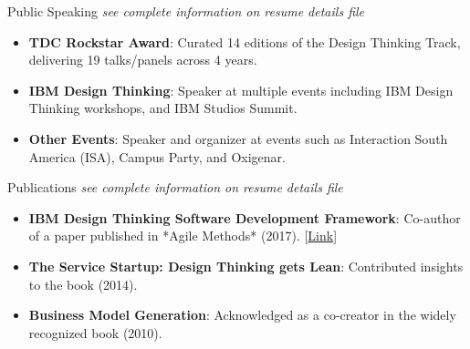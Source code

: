 \documentclass{resume} %
\begin{document}

\begin{rSection}{Public Speaking } 
\textit{see complete information on resume details file}
\begin{itemize}
    \item \textbf{TDC Rockstar Award}: Curated 14 editions of the Design Thinking Track, delivering 19 talks/panels across 4 years.
    \item \textbf{IBM Design Thinking}: Speaker at multiple events including IBM Design Thinking workshops, and IBM Studios Summit.
    \item \textbf{Other Events}: Speaker and organizer at events such as Interaction South America (ISA), Campus Party, and Oxigenar.
\end{itemize}
\end{rSection}

\begin{rSection}{Publications} 
\textit{see complete information on resume details file}
\begin{itemize}
    \item \textbf{IBM Design Thinking Software Development Framework}: Co-author of a paper published in *Agile Methods* (2017). [\href{https://bit.ly/adilsonchicoria-ibm-design-thinking-article}{Link}]
    \item \textbf{The Service Startup: Design Thinking gets Lean}: Contributed insights to the book (2014).
    \item \textbf{Business Model Generation}: Acknowledged as a co-creator in the widely recognized book (2010).
\end{itemize}
\end{rSection}
\end{document}

